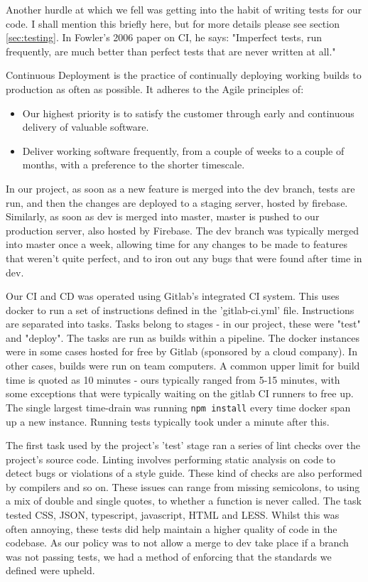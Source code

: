 \documentclass{l3proj}
\begin{document}
Another hurdle at which we fell was getting into the habit of writing tests for our code. I shall
 mention this briefly here, but for more details please see section \ref{sec:testing}. In Fowler's
 2006 paper on CI, he says: "Imperfect tests, run frequently, are much better than perfect tests
 that are never written at all."\cite{fowler2006continuous}

Continuous Deployment is the practice of continually deploying working builds to production
 as often as possible. It adheres to the Agile principles of:
 \begin{itemize}
 \item
 Our highest priority is to satisfy the customer
 through early and continuous delivery
 of valuable software. \cite{agileprinciples}
 \item
 Deliver working software frequently, from a
 couple of weeks to a couple of months, with a
 preference to the shorter timescale. \cite{agileprinciples}
 \end{itemize}
 In our project, as soon as a new feature is merged into the dev branch,
 tests are run, and then the changes are deployed to a staging server, hosted by firebase. Similarly,
 as soon as dev is merged into master, master is pushed to our production server, also hosted by Firebase.
 The dev branch was typically merged into master once a week, allowing time for any changes to be made
 to features that weren't quite perfect, and to iron out any bugs that were found after time in dev.

Our CI and CD was operated using Gitlab's integrated CI system. This uses docker to
 run a set of instructions defined in the 'gitlab-ci.yml' file.  Instructions are
 separated into tasks. Tasks belong to stages - in our project, these were
 "test" and "deploy". The tasks are run as builds within a pipeline. The docker instances were
 in some cases hosted for free by Gitlab (sponsored by a cloud company). In other cases,
 builds were run on team computers. A common upper limit for build time is quoted as
 10 minutes\cite{fowler2006continuous} - ours typically ranged from 5-15 minutes, with some exceptions that were
 typically waiting on the gitlab CI runners to free up. The single largest time-drain was
 running \texttt{npm install} every time docker span up a new instance. Running tests typically took under
 a minute after this.

 

The first task used by the project's 'test' stage ran a series of lint checks over the
 project's source code. Linting involves performing static analysis on code to detect bugs
 or violations of a style guide. These kind of checks are also performed by compilers and
 so on. These issues can range from missing semicolons, to using a mix of
 double and single quotes, to whether a function is never called. The task tested CSS,
 JSON, typescript, javascript,  HTML and LESS. Whilst this was often annoying, these tests
 did help maintain a higher quality of code in the codebase. As our policy was to not allow a
 merge to dev take place if a branch was not passing tests, we had a method of
 enforcing that the standards we defined were upheld.
\end{document}
